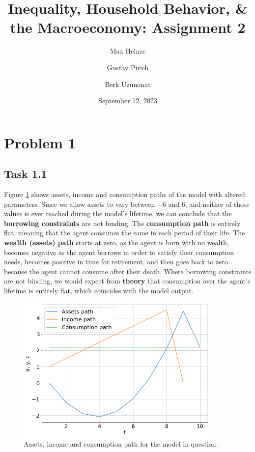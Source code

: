 \documentclass[a4paper, 12pt]{article}
\title{\bfseries Inequality, Household Behavior, \& the Macroeconomy: Assignment 2}
\author{Max Heinze\and Gustav Pirich \and Berk Uzunonat}
\date{September 12, 2023}
\begin{document}
\maketitle

\section*{Problem 1}

\subsection*{Task 1.1}

Figure \ref{fig:graph11} shows assets, income and consumption paths of the model with altered parameters. Since we allow assets to vary between $-6$ and 6, and neither of those values is ever reached during the model's lifetime, we can conclude that the \textbf{borrowing constraints} are not binding. The \textbf{consumption path} is entirely flat, meaning that the agent consumes the same in each period of their life. The \textbf{wealth (assets) path} starts at zero, as the agent is born with no wealth, becomes negative as the agent borrows in order to satisfy their consumption needs, becomes positive in time for retirement, and then goes back to zero because the agent cannot consume after their death. Where borrowing constraints are not binding, we would expect from \textbf{theory} that consumption over the agent's lifetime is entirely flat, which coincides with the model output.

\begin{figure}[H]
    \centering
    \includegraphics[width = 10cm]{task_1_1.png}
    \caption{Assets, income and consumption path for the model in question.}
    \label{fig:graph11}
\end{figure}
\end{document}
